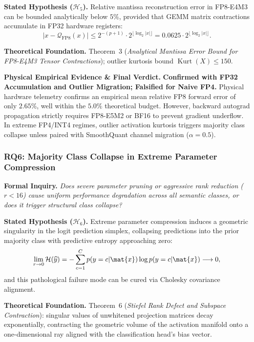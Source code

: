 \noindent\textbf{Stated Hypothesis ($\mathcal{H}_5$).}
Relative mantissa reconstruction error in FP8-E4M3 can be bounded analytically below $5\%$, provided that GEMM matrix contractions accumulate in FP32 hardware registers:
\begin{equation}
\label{eq:rq5_hypothesis}
|x - \mathcal{Q}_{\text{FP8}}(x)| \le 2^{-(p+1)} \cdot 2^{\lfloor \log_2 |x| \rfloor} = 0.0625 \cdot 2^{\lfloor \log_2 |x| \rfloor}.
\end{equation}

\noindent\textbf{Theoretical Foundation.}
Theorem~3 (\emph{Analytical Mantissa Error Bound for FP8-E4M3 Tensor Contractions}); outlier kurtosis bound $\operatorname{Kurt}(X) \le 150$.

\noindent\textbf{Physical Empirical Evidence \& Final Verdict.}
\textbf{Confirmed with FP32 Accumulation and Outlier Migration; Falsified for Naive FP4.}
Physical hardware telemetry confirms an empirical mean relative FP8 forward error of only $2.65\%$, well within the $5.0\%$ theoretical budget.
However, backward autograd propagation strictly requires FP8-E5M2 or BF16 to prevent gradient underflow.
In extreme FP4/INT4 regimes, outlier activation kurtosis triggers majority class collapse unless paired with SmoothQuant channel migration ($\alpha = 0.5$).

\subsubsection{RQ6: Majority Class Collapse in Extreme Parameter Compression}
\label{subsubsec:rq6}

\noindent\textbf{Formal Inquiry.}
\emph{Does severe parameter pruning or aggressive rank reduction ($r < 16$) cause uniform performance degradation across all semantic classes, or does it trigger structural class collapse?}

\noindent\textbf{Stated Hypothesis ($\mathcal{H}_6$).}
Extreme parameter compression induces a geometric singularity in the logit prediction simplex, collapsing predictions into the prior majority class with predictive entropy approaching zero:
\begin{equation}
\label{eq:rq6_hypothesis}
\lim_{r \to 0} \mathcal{H}(\widehat{y}) = -\sum_{c=1}^C p(y=c|\mat{x}) \log p(y=c|\mat{x}) \longrightarrow 0,
\end{equation}
and this pathological failure mode can be cured via Cholesky covariance alignment.

\noindent\textbf{Theoretical Foundation.}
Theorem~6 (\emph{Stiefel Rank Defect and Subspace Contraction}): singular values of unwhitened projection matrices decay exponentially, contracting the geometric volume of the activation manifold onto a one-dimensional ray aligned with the classification head's bias vector.


